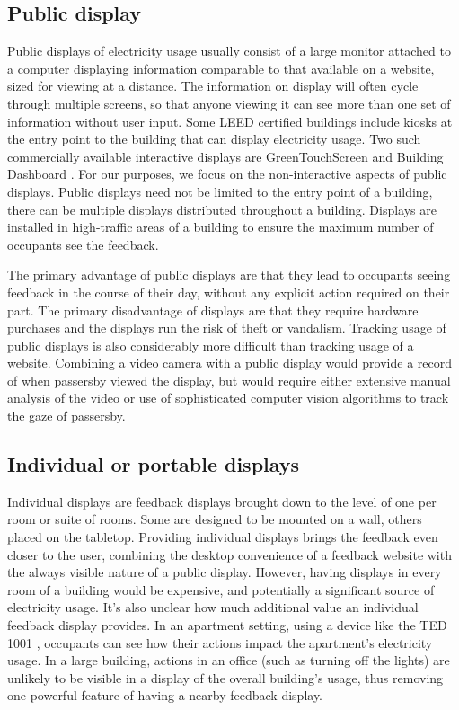 \documentclass[11pt]{article}
\begin{document}
\subsection{Public display}

Public displays of electricity usage usually consist of a large monitor attached to a computer displaying information comparable to that available on a website, sized for viewing at a distance. The information on display will often cycle through multiple screens, so that anyone viewing it can see more than one set of information without user input. Some LEED certified buildings include kiosks at the entry point to the building that can display electricity usage. Two such commercially available interactive displays are GreenTouchScreen and Building Dashboard \cite{greentouchscreen, building-dashboard}. For our purposes, we focus on the non-interactive aspects of public displays. Public displays need not be limited to the entry point of a building, there can be multiple displays distributed throughout a building. Displays are installed in high-traffic areas of a building to ensure the maximum number of occupants see the feedback.

The primary advantage of public displays are that they lead to occupants seeing feedback in the course of their day, without any explicit action required on their part. The primary disadvantage of displays are that they require hardware purchases and the displays run the risk of theft or vandalism. Tracking usage of public displays is also considerably more difficult than tracking usage of a website. Combining a video camera with a public display would provide a record of when passersby viewed the display, but would require either extensive manual analysis of the video or use of sophisticated computer vision algorithms to track the gaze of passersby.

\subsection{Individual or portable displays}

Individual displays are feedback displays brought down to the level of one per room or suite of rooms. Some are designed to be mounted on a wall, others placed on the tabletop. Providing individual displays brings the feedback even closer to the user, combining the desktop convenience of a feedback website with the always visible nature of a public display. However, having displays in every room of a building would be expensive, and potentially a significant source of electricity usage. It's also unclear how much additional value an individual feedback display provides. In an apartment setting, using a device like the TED 1001 \cite{the-energy-detective}, occupants can see how their actions impact the apartment's electricity usage. In a large building, actions in an office (such as turning off the lights) are unlikely to be visible in a display of the overall building's usage, thus removing one powerful feature of having a nearby feedback display.
\end{document}

